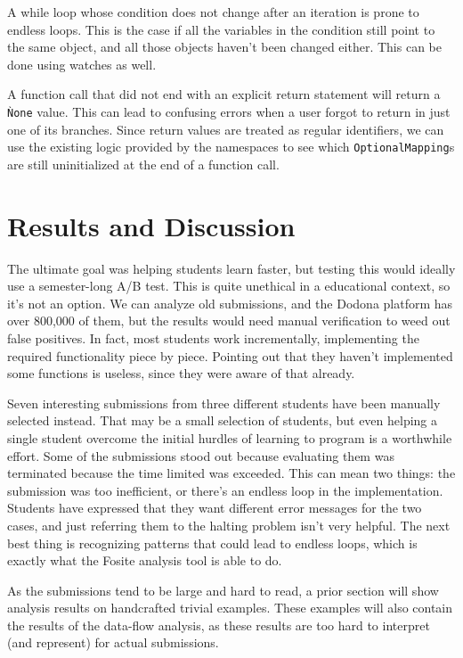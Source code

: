 \documentclass[a4paper, 16pt, oneside]{Thesis}
\begin{document}
A while loop whose condition does not change after an iteration is prone
to endless loops. This is the case if all the variables in the condition
still point to the same object, and all those objects haven't been
changed either. This can be done using watches as well.

A function call that did not end with an explicit return statement will
return a \texttt{Ǹone} value. This can lead to confusing errors when a
user forgot to return in just one of its branches. Since return values
are treated as regular identifiers, we can use the existing logic
provided by the namespaces to see which \texttt{OptionalMapping}s are
still uninitialized at the end of a function call.

\chapter{Results and Discussion}\label{results-and-discussion}

The ultimate goal was helping students learn faster, but testing this
would ideally use a semester-long A/B test. This is quite unethical in a
educational context, so it's not an option. We can analyze old
submissions, and the Dodona platform has over 800,000 of them, but the
results would need manual verification to weed out false positives. In
fact, most students work incrementally, implementing the required
functionality piece by piece. Pointing out that they haven't implemented
some functions is useless, since they were aware of that already.

Seven interesting submissions from three different students have been
manually selected instead. That may be a small selection of students,
but even helping a single student overcome the initial hurdles of
learning to program is a worthwhile effort. Some of the submissions
stood out because evaluating them was terminated because the time
limited was exceeded. This can mean two things: the submission was too
inefficient, or there's an endless loop in the implementation. Students
have expressed that they want different error messages for the two
cases, and just referring them to the halting problem isn't very
helpful. The next best thing is recognizing patterns that could lead to
endless loops, which is exactly what the Fosite analysis tool is able to
do.

As the submissions tend to be large and hard to read, a prior section
will show analysis results on handcrafted trivial examples. These
examples will also contain the results of the data-flow analysis, as
these results are too hard to interpret (and represent) for actual
submissions.
\end{document}
